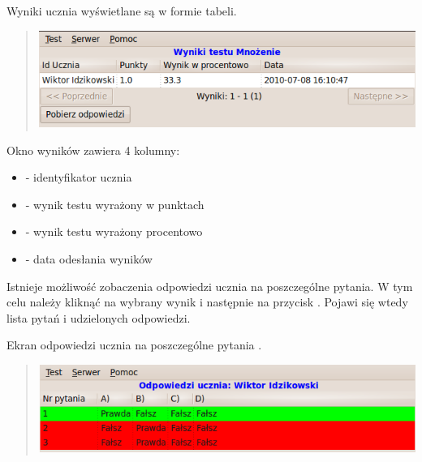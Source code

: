 \documentclass[letterpaper,10pt,polish]{sphinxmanual}
\begin{document}
Wyniki ucznia wyświetlane są w formie tabeli.
\begin{quote}

\includegraphics{WynikiUcznia.png}
\end{quote}

Okno wyników zawiera 4 kolumny:
\begin{itemize}
\item {} 
 - identyfikator ucznia

\item {} 
 - wynik testu wyrażony w punktach

\item {} 
 - wynik testu wyrażony procentowo

\item {} 
 - data odesłania wyników

\end{itemize}

Istnieje możliwość zobaczenia odpowiedzi ucznia na poszczególne pytania. W tym celu należy kliknąć na wybrany wynik i następnie na przycisk . Pojawi się wtedy lista pytań i udzielonych odpowiedzi.

Ekran odpowiedzi ucznia na poszczególne pytania .
\begin{quote}

\includegraphics{OdpowiedziUcznia.png}
\end{quote}



\renewcommand{\indexname}{Indeks}
\printindex
\end{document}
